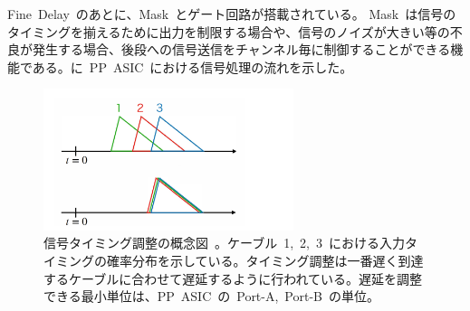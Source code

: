 Fine~Delay~のあとに、Mask~とゲート回路が搭載されている。
Mask~は信号のタイミングを揃えるために出力を制限する場合や、信号のノイズが大きい等の不良が発生する場合、後段への信号送信をチャンネル毎に制御することができる機能である。に~PP~ASIC~における信号処理の流れを示した。
\begin{figure}[H]
        \centering   
        \includegraphics[width=0.65\textwidth,page=1]{img/slide/slide.pdf}
        \caption[信号タイミング調整の概念図]{信号タイミング調整の概念図~\cite{URL:09}。ケーブル~1,~2,~3~における入力タイミングの確率分布を示している。タイミング調整は一番遅く到達するケーブルに合わせて遅延するように行われている。遅延を調整できる最小単位は、PP~ASIC~の~Port-A,~Port-B~の単位。}
        \label{fig:delay}
\end{figure}

